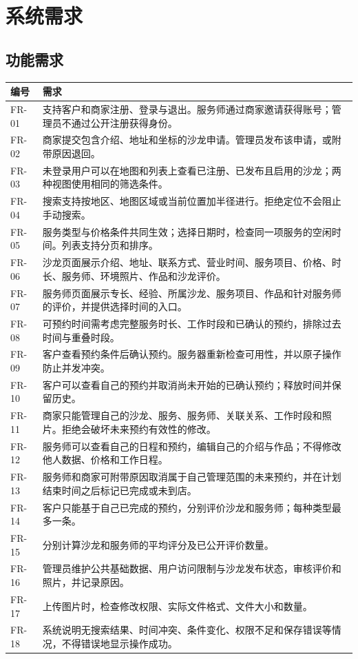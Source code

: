 \section{系统需求}
\subsection{功能需求}
\begin{longtable}{L{1.9cm}L{12.9cm}}
\toprule 编号 & 需求 \\ \midrule
\endhead
FR-01 & 支持客户和商家注册、登录与退出。服务师通过商家邀请获得账号；管理员不通过公开注册获得身份。 \\
FR-02 & 商家提交包含介绍、地址和坐标的沙龙申请。管理员发布该申请，或附带原因退回。 \\
FR-03 & 未登录用户可以在地图和列表上查看已注册、已发布且启用的沙龙；两种视图使用相同的筛选条件。 \\
FR-04 & 搜索支持按地区、地图区域或当前位置加半径进行。拒绝定位不会阻止手动搜索。 \\
FR-05 & 服务类型与价格条件共同生效；选择日期时，检查同一项服务的空闲时间。列表支持分页和排序。 \\
FR-06 & 沙龙页面展示介绍、地址、联系方式、营业时间、服务项目、价格、时长、服务师、环境照片、作品和沙龙评价。 \\
FR-07 & 服务师页面展示专长、经验、所属沙龙、服务项目、作品和针对服务师的评价，并提供选择时间的入口。 \\
FR-08 & 可预约时间需考虑完整服务时长、工作时段和已确认的预约，排除过去时间与重叠时段。 \\
FR-09 & 客户查看预约条件后确认预约。服务器重新检查可用性，并以原子操作防止并发冲突。 \\
FR-10 & 客户可以查看自己的预约并取消尚未开始的已确认预约；释放时间并保留历史。 \\
FR-11 & 商家只能管理自己的沙龙、服务、服务师、关联关系、工作时段和照片。拒绝会破坏未来预约有效性的修改。 \\
FR-12 & 服务师可以查看自己的日程和预约，编辑自己的介绍与作品；不得修改他人数据、价格和工作日程。 \\
FR-13 & 服务师和商家可附带原因取消属于自己管理范围的未来预约，并在计划结束时间之后标记已完成或未到店。 \\
FR-14 & 客户只能基于自己已完成的预约，分别评价沙龙和服务师；每种类型最多一条。 \\
FR-15 & 分别计算沙龙和服务师的平均评分及已公开评价数量。 \\
FR-16 & 管理员维护公共基础数据、用户访问限制与沙龙发布状态，审核评价和照片，并记录原因。 \\
FR-17 & 上传图片时，检查修改权限、实际文件格式、文件大小和数量。 \\
FR-18 & 系统说明无搜索结果、时间冲突、条件变化、权限不足和保存错误等情况，不得错误地显示操作成功。 \\
\bottomrule
\end{longtable}

